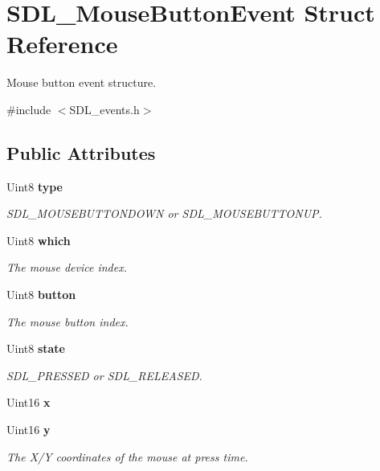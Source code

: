 \section{S\+D\+L\+\_\+\+Mouse\+Button\+Event Struct Reference}
\label{struct_s_d_l___mouse_button_event}


Mouse button event structure.  




{\ttfamily \#include $<$S\+D\+L\+\_\+events.\+h$>$}

\subsection*{Public Attributes}
\begin{DoxyCompactItemize}
\item 
Uint8 {\bf type}\label{struct_s_d_l___mouse_button_event_a529beaceaf87d55792af53fa48d34c4b}

\begin{DoxyCompactList}\small\item\em S\+D\+L\+\_\+\+M\+O\+U\+S\+E\+B\+U\+T\+T\+O\+N\+D\+O\+W\+N or S\+D\+L\+\_\+\+M\+O\+U\+S\+E\+B\+U\+T\+T\+O\+N\+U\+P. \end{DoxyCompactList}\item 
Uint8 {\bf which}\label{struct_s_d_l___mouse_button_event_af8fca7f59b8a6e3eeab6b54c494e58b7}

\begin{DoxyCompactList}\small\item\em The mouse device index. \end{DoxyCompactList}\item 
Uint8 {\bf button}\label{struct_s_d_l___mouse_button_event_a1a4680e19ae06d02d2093f0bcba1b24c}

\begin{DoxyCompactList}\small\item\em The mouse button index. \end{DoxyCompactList}\item 
Uint8 {\bf state}\label{struct_s_d_l___mouse_button_event_a8809cef85cfffad4f2059f2ba4fc6a3d}

\begin{DoxyCompactList}\small\item\em S\+D\+L\+\_\+\+P\+R\+E\+S\+S\+E\+D or S\+D\+L\+\_\+\+R\+E\+L\+E\+A\+S\+E\+D. \end{DoxyCompactList}\item 
Uint16 {\bfseries x}\label{struct_s_d_l___mouse_button_event_a6956f6083abfbcc0052f9483fa1c5ffd}

\item 
Uint16 {\bf y}\label{struct_s_d_l___mouse_button_event_ae22a30e4b491a0cac67dd72d22fdbf80}

\begin{DoxyCompactList}\small\item\em The X/\+Y coordinates of the mouse at press time. \end{DoxyCompactList}\end{DoxyCompactItemize}


